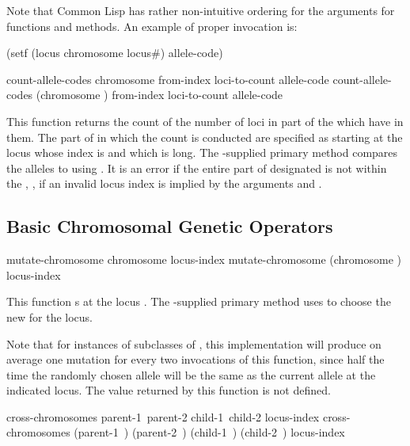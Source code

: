 {\filbreak
Note that Common Lisp has rather non-intuitive ordering for the
arguments for  functions and methods.  An example of proper
invocation is: \begin{clcode}(setf (locus chromosome locus#) allele-code)\end{clcode}

\filbreak
{\samepage
\Defgeneric count-allele-codes {chromosome from-index loci-to-count allele-code}
 count-allele-codes {(chromosome ) from-index loci-to-count allele-code}

This function returns the count of the number of loci in part of the
 which have  in them. The part of 
in which the count is conducted are specified as starting at the locus whose index
is  and which is  long. The \geco-supplied
primary method compares the alleles to  using . It is an
error if the entire part of  designated is not within the , \ie, if an invalid locus index is implied by the arguments 
and .
\par}%

\filbreak
{\samepage
\subsection{Basic Chromosomal Genetic Operators}

\Defgeneric mutate-chromosome {chromosome locus-index}
 mutate-chromosome {(chromosome ) locus-index}

This function s  at the locus .
The \geco-supplied primary method uses  to choose
the new  for the locus.

Note that for instances of subclasses of ,
this implementation will produce on average one mutation for every two
invocations of this function, since half the time the randomly chosen
allele will be the same as the current allele at the indicated locus.
The value returned by this function is not defined.
\par}%

\filbreak
{\samepage
\Defgeneric cross-chromosomes {\hbox{parent-1 parent-2}
                               \hbox{child-1 child-2}
                               locus-index}
 cross-chromosomes {\hbox{(parent-1 )}
                              \hbox{(parent-2 )}
                              \hbox{(child-1 )}
                              \hbox{(child-2 )}
                              locus-index}

}}
